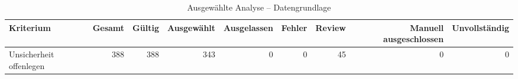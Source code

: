 \begin{table}[htbp]
\centering
\caption{Ausgewählte Analyse -- Datengrundlage}
\begin{tabular}{lrrrrrrrr}
\toprule
Kriterium & Gesamt & Gültig & Ausgewählt & Ausgelassen & Fehler & Review & Manuell ausgeschlossen & Unvollständig \\
\midrule
Unsicherheit offenlegen & 388 & 388 & 343 & 0 & 0 & 45 & 0 & 0 \\
\bottomrule
\end{tabular}
\end{table}
